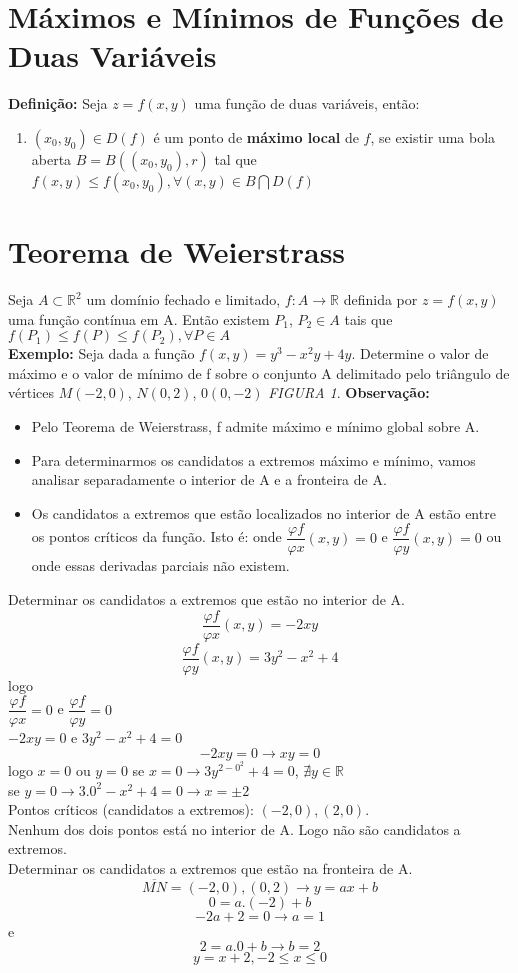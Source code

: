 \documentclass{article}
\begin{document}
	\section{Máximos e Mínimos de Funções de Duas Variáveis}
		\textbf{Definição:} Seja $z=f(x,y)$ uma função de duas variáveis, então:
		\begin{enumerate}
			\item $(x_0,y_0) \in D(f)$ é um ponto de \textbf{máximo local} de $f$, se existir uma bola aberta $B = B((x_0,y_0),r)$ tal que $f(x,y) \leq f(x_0,y_0) , \forall (x,y) \in B \bigcap D(f)$
		\end{enumerate}
		
	\section{Teorema de Weierstrass} 
		Seja $A \subset \mathbb{R}^2$ um domínio fechado e limitado, $f:A \to \mathbb{R}$ definida por $z=f(x,y)$ uma função contínua em A. Então existem $P_1$, $P_2 \in A$ tais que $f(P_1) \leq f(P) \leq f(P_2), \forall P \in A$\\
		\textbf{Exemplo:} Seja dada a função $f(x,y)=y^3-x^2y+4y$. Determine o valor de máximo e o valor de mínimo de f sobre o conjunto A delimitado pelo triângulo de vértices $M(-2,0)$, $N(0,2)$, $0(0,-2)$  \textit{FIGURA 1}.
		\textbf{Observação:}
		\begin{itemize}
			\item Pelo Teorema de Weierstrass, f admite máximo e mínimo global sobre A.
			\item Para determinarmos os candidatos a extremos máximo e mínimo, vamos analisar separadamente o interior de A e a fronteira de A.
			\item Os candidatos a extremos que estão localizados no interior de A estão entre os pontos críticos da função. Isto é: onde $\dfrac{\varphi f}{\varphi x}(x,y)=0$ e $\dfrac{\varphi f}{\varphi y}(x,y)=0$ ou onde essas derivadas parciais não existem.
		\end{itemize}
		Determinar os candidatos a extremos que estão no interior de A.
		$$\dfrac{\varphi f}{\varphi x}(x,y)=-2xy$$
		$$\dfrac{\varphi f}{\varphi y}(x,y)= 3y^2-x^2+4$$
		logo\\
		$\dfrac{\varphi f}{\varphi x}=0$ e $\dfrac{\varphi f}{\varphi y}= 0$\\
		$-2xy=0$ e $3y^2 -x^2+4=0$\\
		$$-2xy=0 \to xy=0 $$
		logo $ x=0$ ou $y=0$
		se $x=0 \to 3y^{2-0^2}+4=0$, $\nexists y \in \mathbb{R}$\\
		se $y=0 \to 3.0^2-x^2+4=0\to x= \pm 2$\\%
		Pontos críticos (candidatos a extremos): $(-2,0),(2,0)$.\\
		Nenhum dos dois pontos está no interior de A. Logo não são candidatos a extremos.\\
		Determinar os candidatos a extremos que estão na fronteira de A.
		$$\overline{MN} = (-2,0),(0,2) \to y = ax+b$$
		$$0 = a.(-2) +b$$
		$$-2a+2=0\to a = 1$$
		e
		$$2=a.0+b \to b=2$$
		$$y=x+2, -2\leq x \leq 0$$
		
\end{document}
